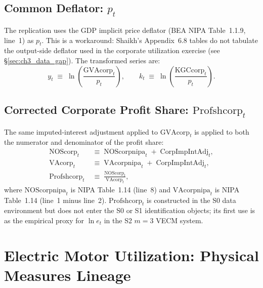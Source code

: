 \documentclass[11pt,a4paper]{article}
\begin{document}
\subsection{Common Deflator: \texorpdfstring{$p_t$}{p\_t}}

The replication uses the GDP implicit price deflator (BEA NIPA
Table~1.1.9, line~1) as $p_t$. This is a workaround: Shaikh's
Appendix~6.8 tables do not tabulate the output-side deflator used in the
corporate utilization exercise (see \S\ref{sec:ch3_data_gap}). The
transformed series are:
%
\begin{equation}
	\label{eq:app_deflator}
	y_t \;\equiv\; \ln\!\left(\frac{\text{GVAcorp}_t}{p_t}\right),
	\qquad
	k_t \;\equiv\; \ln\!\left(\frac{\text{KGCcorp}_t}{p_t}\right).
\end{equation}


\subsection{Corrected Corporate Profit Share: \texorpdfstring{$\text{Profshcorp}_t$}{Profshcorp}}

The same imputed-interest adjustment applied to $\text{GVAcorp}_t$ is
applied to both the numerator and denominator of the profit share:
%
\begin{align}
	\text{NOScorp}_t
	&\;\equiv\; \text{NOScorpnipa}_t \;+\; \text{CorpImpIntAdj}_t,
	\label{eq:app_nos} \\
	\text{VAcorp}_t
	&\;\equiv\; \text{VAcorpnipa}_t \;+\; \text{CorpImpIntAdj}_t,
	\label{eq:app_va} \\
	\text{Profshcorp}_t
	&\;\equiv\; \frac{\text{NOScorp}_t}{\text{VAcorp}_t},
	\label{eq:app_profshcorp}
\end{align}
%
where $\text{NOScorpnipa}_t$ is NIPA Table~1.14 (line~8) and
$\text{VAcorpnipa}_t$ is NIPA Table~1.14 (line~1 minus line~2).
$\text{Profshcorp}_t$ is constructed in the S0 data environment but does
not enter the S0 or S1 identification objects; its first use is as the
empirical proxy for $\ln e_t$ in the S2 $m=3$ VECM system.

\section{Electric Motor Utilization: Physical Measures Lineage}
\label{app:emu_lineage}
\end{document}
